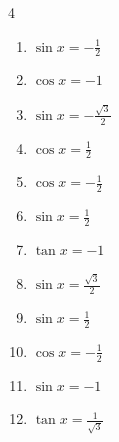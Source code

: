 \begin{multicols}{4}
\begin{enumerate}
  \item $\displaystyle \sin{x}  = -\frac{1}{2}$


  \item $\displaystyle \cos{x}  = -1$


\columnbreak %

  \item $\displaystyle \sin{x}  = -\frac{\sqrt{3}}{2}$


  \item $\displaystyle \cos{x}  = \frac{1}{2}$


  \item $\displaystyle \cos{x}  = -\frac{1}{2}$


  \item $\displaystyle \sin{x}  = \frac{1}{2}$


  \item $\displaystyle \tan{x}  = -1$


  \item $\displaystyle \sin{x}  = \frac{\sqrt{3}}{2}$


  \item $\displaystyle \sin{x}  = \frac{1}{2}$


  \item $\displaystyle \cos{x}  = -\frac{1}{2}$


  \item $\displaystyle \sin{x}  = -1$


  \item $\displaystyle \tan{x}  = \frac{1}{\sqrt{3}}$


\end{enumerate}
\end{multicols}
